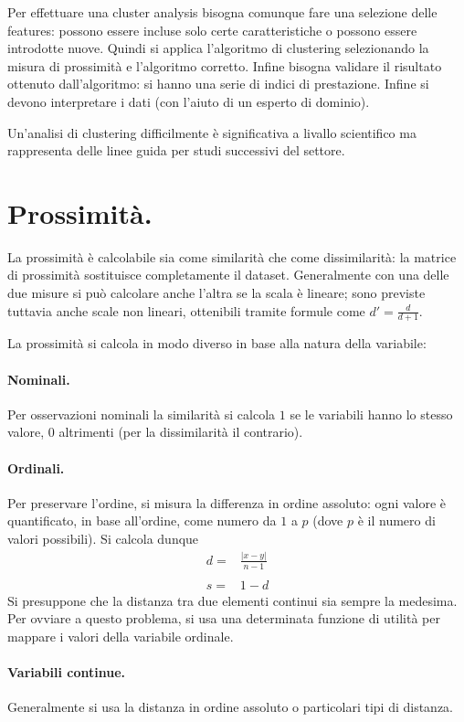 \documentclass[11pt, a4page, twocolumn]{article}
\begin{document}
Per effettuare una cluster analysis bisogna comunque fare una selezione delle features: possono essere incluse solo certe caratteristiche o possono essere introdotte nuove.
Quindi si applica l'algoritmo di clustering selezionando la misura di prossimità e l'algoritmo corretto.
Infine bisogna validare il risultato ottenuto dall'algoritmo: si hanno una serie di indici di prestazione.
Infine si devono interpretare i dati (con l'aiuto di un esperto di dominio).

Un'analisi di clustering difficilmente è significativa a livallo scientifico ma rappresenta delle linee guida per studi successivi del settore.

\section{Prossimità.}
La prossimità è calcolabile sia come similarità che come dissimilarità: la matrice di prossimità sostituisce completamente il dataset.
Generalmente con una delle due misure si può calcolare anche l'altra se la scala è lineare; sono previste tuttavia anche scale non lineari, ottenibili tramite formule come $d' = \frac{d}{d+1}$.

La prossimità si calcola in modo diverso in base alla natura della variabile:

\paragraph{Nominali.}
Per osservazioni nominali la similarità si calcola $1$ se le variabili hanno lo stesso valore, $0$ altrimenti (per la dissimilarità il contrario).

\paragraph{Ordinali.}
Per preservare l'ordine, si misura la differenza in ordine assoluto: ogni valore è quantificato, in base all'ordine, come numero da $1$ a $p$ (dove $p$ è il numero di valori possibili).
Si calcola dunque
\begin{align*}
d =& \frac{{|x - y|}}{n - 1} \\ \\
s =& 1 - d
\end{align*}
Si presuppone che la distanza tra due elementi continui sia sempre la medesima.
Per ovviare a questo problema, si usa una determinata funzione di utilità per mappare i valori della variabile ordinale.

\paragraph{Variabili continue.}
Generalmente si usa la distanza in ordine assoluto o particolari tipi di distanza.
\end{document}
